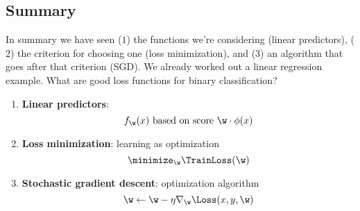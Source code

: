 \subsection{Summary} %
\label{sub:summary}
% 
In summary we have seen ($1$) the functions we're considering (linear predictors),
($2$) the criterion for choosing one (loss minimization),
and ($3$) an algorithm that goes after that criterion (SGD).
% 
We already worked out a linear regression example.
What are good loss functions for binary classification?
\begin{enumerate}
    \item \textbf{Linear predictors}:
    \[
        f_{\w}(x) \text{ based on score } \w\cdot\phi(x)
    \]

    \item \textbf{Loss minimization}: learning as optimization
    \[
        \minimize_{\w} \TrainLoss(\w)
    \]

    \item \textbf{Stochastic gradient descent}: optimization algorithm
    \[
        \w \leftarrow \w - \eta \nabla_{\w} \Loss(x,y,\w)
    \]
\end{enumerate}


